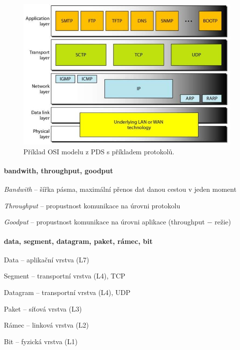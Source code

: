 \begin{figure}[H]
    \centering
    \includegraphics[width=1\linewidth]{osi_model_pds.png}
    \caption{Příklad OSI modelu z PDS s příkladem protokolů.}
\end{figure}

\paragraph*{bandwith, throughput, goodput} \begin{compactitem}
    \item \textit{Bandwith} -- šířka pásma, maximální přenos dat danou cestou v jeden moment
    \item \textit{Throughput} -- propustnost komunikace na úrovni protokolu
    \item \textit{Goodput} -- propustnost komunikace na úrovni aplikace (throughput $-$ režie)
\end{compactitem}

\paragraph*{data, segment, datagram, paket, rámec, bit} \begin{compactitem}
    \item Data -- aplikační vrstva (L7)
    \item Segment -- transportní vrstva (L4), TCP
    \item Datagram -- transportní vrstva (L4), UDP
    \item Paket -- síťová vrstva (L3)
    \item Rámec -- linková vrstva (L2)
    \item Bit -- fyzická vrstva (L1)
\end{compactitem}

